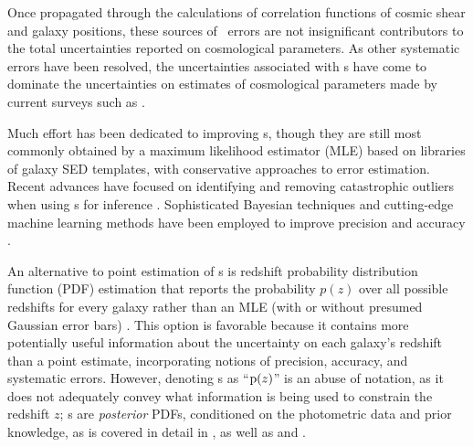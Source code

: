 Once propagated through the calculations of correlation functions of cosmic shear and galaxy positions, these sources of \pz\ errors are not insignificant contributors to the total uncertainties reported on cosmological parameters.
As other systematic errors have been resolved, the uncertainties associated with \pz s have come to dominate the uncertainties on estimates of cosmological parameters made by current surveys such as \citep[\des][]{hoyle_dark_2017}.

Much effort has been dedicated to improving \pz s, though they are still most commonly obtained by a maximum likelihood estimator (MLE) based on libraries of galaxy SED templates, with conservative approaches to error estimation.  
Recent advances have focused on identifying and removing catastrophic outliers when using \pz s for 
inference \citep{Gorecki2014}.  
Sophisticated Bayesian techniques and cutting-edge machine learning methods have been employed to improve precision \citep{Carliles2010} and accuracy \citep{Sadeh2015}. 

An alternative to point estimation of \pz s is redshift probability distribution function (PDF) estimation that reports the probability $p(z)$ over all possible redshifts for every galaxy rather than an MLE (with or without presumed Gaussian error bars) \citep{Koo1999}.  
This option is favorable because it contains more potentially useful information about the uncertainty on each galaxy's redshift than a point estimate, incorporating notions of precision, accuracy, and systematic errors.
However, denoting \pzpdf s as ``$\mathrm{p}(z)$'' is an abuse of notation, as it does not adequately convey what information is being used to constrain the redshift $z$; \pzpdf s are \textit{posterior} PDFs, conditioned on the photometric data and prior knowledge, as is covered in detail in , as well as  and .



